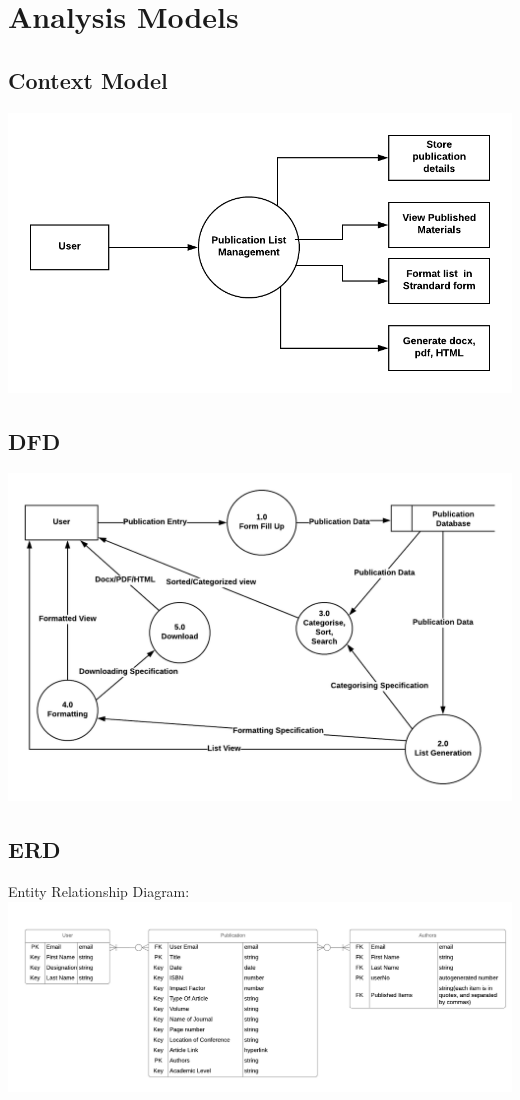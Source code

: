 \documentclass[12pt]{extarticle}
\begin{document}
	\newpage
	\section{Analysis Models}
	\subsection{Context Model}
		\includegraphics[angle=90, scale=1.7]{dfd0v2}
	\newpage
	\subsection{DFD}
		\includegraphics[angle=90, scale=1.3]{dfd1v2}
	\newpage
	\subsection{ERD}
		Entity Relationship Diagram: \\
		
			\includegraphics[angle=90, scale=1.8]{seq/erdv2}\\
\end{document}
